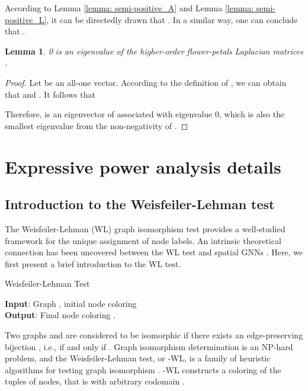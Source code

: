 \documentclass[letterpaper]{article} \usepackage{aaai24}
\theoremstyle{plain}
\newtheorem{lemma}[theorem]{Lemma}
\theoremstyle{definition}
\theoremstyle{remark}
\begin{document}
According to Lemma \ref{lemma: semi-positive_A} and Lemma \ref{lemma: semi-positive_L}, it can be directedly drawn that .
In a similar way, one can conclude that .

\begin{lemma}
0 is an eigenvalue of the higher-order flower-petals Laplacian matrices .
\end{lemma}

\begin{proof}
Let  be an all-one vector. According to the definition of , we can obtain that  and . It follows that


Therefore,  is an eigenvector of  associated with eigenvalue 0, which is also the smallest eigenvalue from the non-negativity of .
\end{proof}



\section{Expressive power analysis details}
\label{appendix: expressive_power_analysis}


\subsection{Introduction to the Weisfeiler-Lehman test}
\label{appendix: WL}



The Weisfeiler-Lehman (WL) graph isomorphism test \cite{WLtest} provides a well-studied framework for the unique assignment of node labels. An intrinsic theoretical connection has been uncovered between the WL test and spatial GNNs \cite{GIN2019, kWL2019}. Here, we first present a brief introduction to the WL test.

\begin{algorithm}[ht] 
\caption{Weisfeiler-Lehman Test}
\label{alg:WL-test}
\textbf{Input}: Graph , initial node coloring  \\
\textbf{Output}: Final node coloring .
\begin{algorithmic}[1] \STATE  
\REPEAT
    \STATE  \ENDFOR
    \STATE 
{}
\end{algorithmic}
\end{algorithm}

Two graphs  and  are considered to be isomorphic if there exists an edge-preserving bijection , i.e.,  if and only if . 
Graph isomorphism determination is an NP-hard problem, and the Weisfeiler-Lehman test, or -WL, is a family of heuristic algorithms for testing graph isomorphism \cite{kWL2019}. -WL constructs a coloring  of the tuples of  nodes, that is  with arbitrary codomain .
\end{document}
